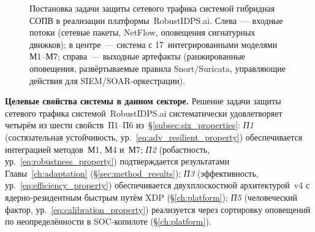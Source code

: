 \begin{figure}[htbp]
\centering
{}
\caption{Постановка задачи защиты сетевого трафика системой
гибридная СОПВ в реализации платформы~\textsf{RobustIDPS.ai}. Слева~---
входные потоки (сетевые пакеты, NetFlow, оповещения сигнатурных
движков); в центре~--- система с 17~интегрированными моделями
М1--М7; справа~--- выходные артефакты (ранжированные оповещения,
развёртываемые правила Snort/Suricata, управляющие действия для
SIEM/SOAR-оркестрации).}
\label{fig:platform_problem_box}
\end{figure}

\noindent\textbf{Целевые свойства системы в данном секторе.}
Решение задачи защиты сетевого трафика
системой~\textsf{RobustIDPS.ai} систематически удовлетворяет
четырём из шести свойств~П1--П6 из~\S\ref{subsec:six_properties}:
\emph{П1} (состязательная устойчивость, ур.~\eqref{eq:adv_resilient_property})
обеспечивается интеграцией методов~М1, М4 и~М7;
\emph{П2} (робастность, ур.~\eqref{eq:robustness_property})
подтверждается результатами Главы~\ref{ch:adaptation}
(\S\ref{sec:method_results});
\emph{П3} (эффективность, ур.~\eqref{eq:efficiency_property})
обеспечивается двухплоскостной архитектурой~v4 с ядерно-резидентным
быстрым путём XDP (\S\ref{ch:platform});
\emph{П5} (человеческий фактор, ур.~\eqref{eq:calibration_property})
реализуется через сортировку оповещений по неопределённости в
SOC-копилоте (\S\ref{ch:platform}).

